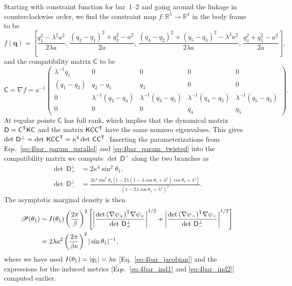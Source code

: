 Starting with constraint function for bar~1--2 and going around the linkage in counterclockwise order, we find the constraint map $f: \mathbb{R}^{5} \to \mathbb{R}^{4}$ in the body frame to be
%
\begin{equation}
  f(\bm{q}) = \left[\frac{q_1^2 - \lambda^2 a^2}{2\lambda a},\, \frac{(q_2 - q_1)^2 + q_3^2 - a^2}{2a},\, \frac{(q_4 - q_2)^2 + (q_5 - q_3)^2 - \lambda^2 a^2}{2\lambda a},\, \frac{q_4^2 + q_5^2 - a^2}{2a}\right],
\end{equation}
%
and the compatibility matrix $\mathsf{C}$ to be
%
\begin{equation}
  \mathsf{C} = \nabla f = a^{-1}\begin{pmatrix}
    \lambda^{-1}q_1 & 0 & 0 & 0 & 0 \\
    (q_1-q_2) & q_2-q_1 & q_3 & 0 & 0\\
    0 & \lambda^{-1}(q_2-q_4) & \lambda^{-1}(q_3-q_5) & \lambda^{-1}(q_4-q_2) & \lambda^{-1}(q_5-q_3)\\
  0 & 0 & 0 & q_4 & q_5
  \label{eq:4bar_compatibility}
\end{pmatrix}.
\end{equation}
At regular points $\mathsf{C}$ has full rank, which implies that the dynamical matrix $\mathsf{D} = \mathsf{C}^\mathsf{T}\mathsf{K}\mathsf{C}$ and the matrix $\mathsf{K}\mathsf{C}\mathsf{C}^\mathsf{T}$ have the same nonzero eigenvalues.
This gives $\det\,\mathsf{D}^\perp = \det\,\mathsf{K}\mathsf{C}\mathsf{C}^\mathsf{T} = \kappa^4\det\,\mathsf{C}\mathsf{C}^\mathsf{T}$.
Inserting the parameterizations from Eqs.~\eqref{eq:4bar_param_parallel} and \eqref{eq:4bar_param_twisted} into the compatibility matrix we compute $\det\,\mathsf{D}^\perp$ along the two branches as
%
\begin{subequations}
\begin{align}
  \det\,\mathsf{D}^\perp_+ &= 2\kappa^4\sin^2\theta_1,\\
  \det\,\mathsf{D}^\perp_- &= \frac{2\kappa^4\sin^2{\theta_1}[1-2\lambda(1-\lambda\cos{\theta_1}+\lambda^2)\cos{\theta_1} + \lambda^4]}{(1-2\lambda\cos{\theta_1}+\lambda^2)^2}.
\end{align}
\end{subequations}
%
The asymptotic marginal density is then
%
\begin{equation}
  \begin{aligned}
    \mathscr{P}(\theta_1) &\sim I(\theta_1)\left(\frac{2\pi}{\beta}\right)^2\left[\left|\frac{\det\,(\nabla\psi_{+})^\mathsf{T}\nabla\psi_+}{\det\,\mathsf{D}_+^\perp}\right|^{1/2} + \left|\frac{\det\,(\nabla\psi_{-})^\mathsf{T}\nabla\psi_-}{\det\,\mathsf{D}_-^\perp}\right|^{1/2}\right]\\
                                           &= 2\lambda a^{2}\left(\frac{2\pi}{\beta\kappa}\right)^2|\sin{\theta_1}|^{-1},
  \end{aligned}
  \label{eq:4bar_r}
\end{equation}
where we have used $I(\theta_{1}) = \lvert q_{1}\rvert = \lambda a$ [Eq.~\eqref{eq:4bar_jacobian}] and the expressions for the induced metrics [Eqs.~\eqref{eq:4bar_ind1} and \eqref{eq:4bar_ind2}] computed earlier.

